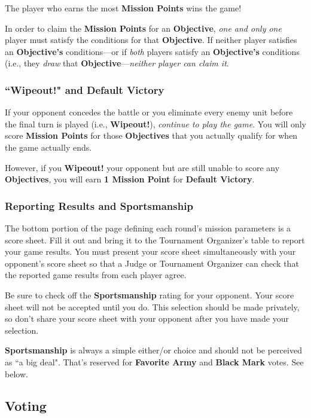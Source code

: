 \documentclass[10pt,titlepage]{article}
\begin{document}
\noindent The player who earns the most \textbf{Mission Points} wins the game!

In order to claim the \textbf{Mission Points} for an \textbf{Objective}, \textit{one and only one} player must satisfy the conditions for that \textbf{Objective}. If neither player satisfies an \textbf{Objective's} conditions---or if \textit{both} players satisfy an \textbf{Objective's} conditions (i.e., they \textit{draw} that \textbf{Objective}---\textit{neither player can claim it}.

\subsubsection*{``Wipeout!" and Default Victory}

If your opponent concedes the battle or you eliminate every enemy unit before the final turn is played (i.e., \textbf{Wipeout!}), \textit{continue to play the game}. You will only score \textbf{Mission Points} for those \textbf{Objectives} that you actually qualify for when the game actually ends.

However, if you \textbf{Wipeout!} your opponent but are still unable to score any \textbf{Objectives}, you will earn \textbf{1 Mission Point} for \textbf{Default Victory}.

\subsubsection*{Reporting Results and Sportsmanship}

The bottom portion of the page defining each round's mission parameters is a score sheet. Fill it out and bring it to the Tournament Organizer's table to report your game results. You must present your score sheet simultaneously with your opponent's score sheet so that a Judge or Tournament Organizer can check that the reported game results from each player agree.

Be sure to check off the \textbf{Sportsmanship} rating for your opponent. Your score sheet will not be accepted until you do. This selection should be made privately, so don't share your score sheet with your opponent after you have made your selection.

\textbf{Sportsmanship} is always a simple either/or choice and should not be perceived as ``a big deal". That's reserved for \textbf{Favorite Army} and \textbf{Black Mark} votes. See below.

\subsection*{Voting}
\end{document}
